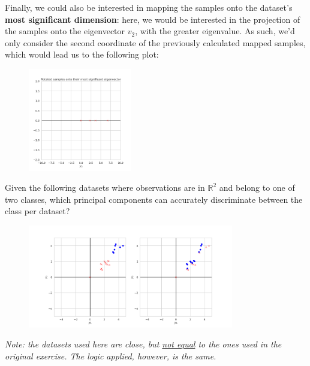 \documentclass[12pt]{article}
\begin{document}
\begin{enumerate}[leftmargin=\labelsep]
  Finally, we could also be interested in mapping the samples onto the dataset's
  \textbf{most significant dimension}: here, we would be interested in the projection
  of the samples onto the eigenvector $v_2$, with the greater eigenvalue. As such,
  we'd only consider the second coordinate of the previously calculated mapped samples,
  which would lead us to the following plot:

  \begin{figure}[H]
    \centering
    \includegraphics[width=0.4\textwidth]{assets/ex-1/kl-transform-1d.png}
    \label{fig:kl-transform-1d}
  \end{figure}

  \begin{tcolorbox}[enhanced jigsaw,halign=center,colback=bg,boxrule=0pt,arc=1pt]
    \item Given the following datasets where observations are in $\mathbb{R}^2$ and belong
    to one of two classes, which principal components can accurately discriminate
    between the class per dataset?
  \end{tcolorbox}

  \begin{figure}[h]
    \centering
    \includegraphics[width=0.8\textwidth]{assets/ex-2/samples.png}
    \label{fig:samples-2}
  \end{figure}

  \textit{Note: the datasets used here are close, but \underline{not equal} to
    the ones used in the original exercise. The logic applied, however, is the same.}


\end{enumerate}
\end{document}
